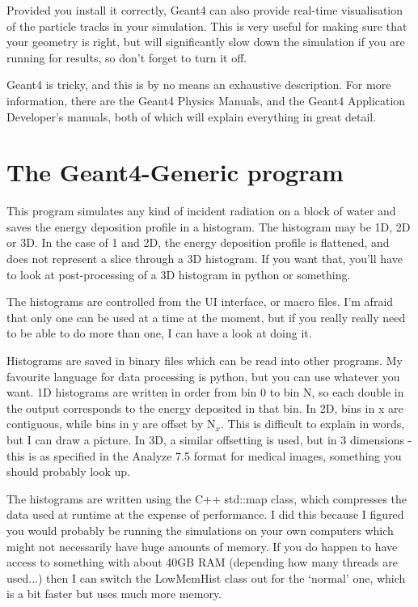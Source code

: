 \documentclass{article}
\begin{document}
Provided you install it correctly, Geant4 can also provide real-time visualisation of the particle tracks in your simulation. This is very useful for making sure that your geometry is right, but will significantly slow down the simulation if you are running for results, so don't forget to turn it off.

Geant4 is tricky, and this is by no means an exhaustive description. For more information, there are the Geant4 Physics Manuals, and the Geant4 Application Developer's manuals, both of which will explain everything in great detail.

\section{The Geant4-Generic program}
This program simulates any kind of incident radiation on a block of water and saves the energy deposition profile in a histogram. The histogram may be 1D, 2D or 3D. In the case of 1 and 2D, the energy deposition profile is flattened, and does not represent a slice through a 3D histogram. If you want that, you'll have to look at post-processing of a 3D histogram in python or something.

The histograms are controlled from the UI interface, or macro files. I'm afraid that only one can be used at a time at the moment, but if you really really need to be able to do more than one, I can have a look at doing it.

Histograms are saved in binary files which can be read into other programs. My favourite language for data processing is python, but you can use whatever you want. 1D histograms are written in order from bin 0 to bin N, so each double in the output corresponds to the energy deposited in that bin. In 2D, bins in x are contiguous, while bins in y are offset by N$_{x}$. This is difficult to explain in words, but I can draw a picture. In 3D, a similar offsetting is used, but in 3 dimensions - this is as specified in the Analyze 7.5 format for medical images, something you should probably look up.

The histograms are written using the C++ std::map class, which compresses the data used at runtime at the expense of performance. I did this because I figured you would probably be running the simulations on your own computers which might not necessarily have huge amounts of memory. If you do happen to have access to something with about 40GB RAM (depending how many threads are used...) then I can switch the LowMemHist class out for the `normal' one, which is a bit faster but uses much more memory.
\end{document}
